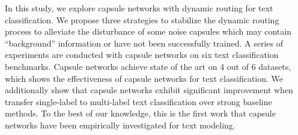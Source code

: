 In this study, we explore capsule networks with dynamic routing for text classification. We propose three strategies to stabilize the dynamic routing process to alleviate the disturbance of some noise capsules which may contain ``background'' information or have not been successfully trained. A series of experiments are conducted with capsule networks on six text classification benchmarks.  Capsule networks achieve state of the art on 4 out of 6 datasets, which shows the effectiveness of capsule networks for text classification. We additionally show that capsule networks exhibit significant improvement when transfer single-label to multi-label text classification over strong baseline methods. To the best of our knowledge, this is the first work that capsule networks have been empirically investigated for text modeling.
